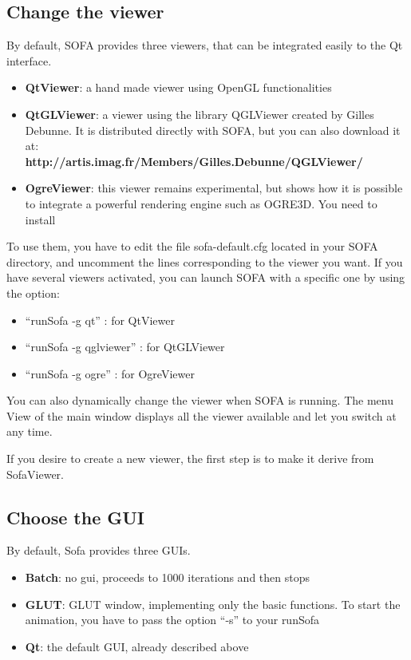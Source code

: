 \subsection{Change the viewer}
By default, SOFA provides three viewers, that can be integrated easily to the Qt interface. 

\begin{itemize}
 \item {\bf QtViewer}: a hand made viewer using OpenGL functionalities
 \item {\bf QtGLViewer}: a viewer using the library QGLViewer created by Gilles Debunne. It is distributed directly with SOFA, but you can also download it at:\\ {\bf http://artis.imag.fr/Members/Gilles.Debunne/QGLViewer/}
 \item {\bf OgreViewer}: this viewer remains experimental, but shows how it is possible to integrate a powerful rendering engine such as OGRE3D. You need to install 
\end{itemize}

To use them, you have to edit the file sofa-default.cfg located in your SOFA directory, and uncomment the lines corresponding to the viewer you want. If you have several viewers activated, you can launch SOFA with a specific one by using the option:
\begin{itemize}
 \item ``runSofa -g qt'' : for QtViewer
 \item ``runSofa -g qglviewer'' : for QtGLViewer
 \item ``runSofa -g ogre'' : for OgreViewer
\end{itemize}

You can also dynamically change the viewer when SOFA is running. The menu View of the main window displays all the viewer available and let you switch at any time.
\par
If you desire to create a new viewer, the first step is to make it derive from SofaViewer. 








\subsection{Choose the GUI}
By default, Sofa provides three GUIs.
\begin{itemize}
 \item {\bf Batch}: no gui, proceeds to 1000 iterations and then stops
 \item {\bf GLUT}: GLUT window, implementing only the basic functions. To start the animation, you have to pass the option ``-s'' to your runSofa
 \item {\bf Qt}: the default GUI, already described above
\end{itemize}

